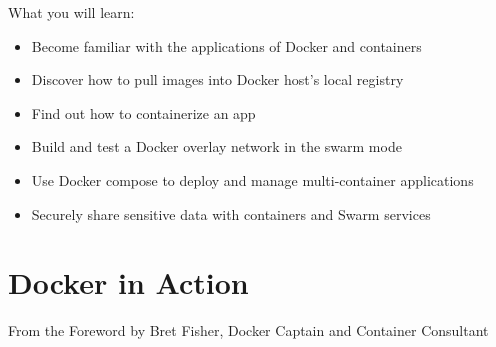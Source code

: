 			
			\noindent What you will learn:
			\begin{itemize}
				\item Become familiar with the applications of Docker and containers
				\item Discover how to pull images into Docker host's local registry
				\item Find out how to containerize an app
				\item Build and test a Docker overlay network in the swarm mode
				\item Use Docker compose to deploy and manage multi-container applications
				\item Securely share sensitive data with containers and Swarm services
			\end{itemize}

		\clearpage
		\section{Docker in Action}
		\label{sec:docker-in-action}
		
			\begin{inparadesc}
				\item \mustread
				\item \nearfivehpages
				\item {}
				\item \printed
			\end{inparadesc}
			\vspace{3mm}
			
			
			\begin{epigraphcenter}{11cm}
				\begin{sansserif}
					
				\end{sansserif}
				\epigraph{
				\begin{sansserif}
			\end{sansserif}}{From the Foreword by Bret Fisher, Docker Captain and Container Consultant}
			\end{epigraphcenter}
			
